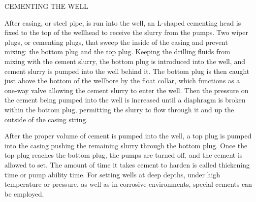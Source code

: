 CEMENTING THE WELL

\vspace{1em}

After casing, or steel pipe, is run into the well, an L-shaped cementing 
head is fixed to the top of the wellhead to receive the slurry from the pumps. 
Two wiper plugs, or cementing plugs, that sweep the
inside of the casing and prevent mixing: the bottom plug and the top plug.
Keeping the drilling fluids from mixing with the cement slurry, 
the bottom plug is introduced into the well, and cement slurry is pumped into the well behind it. 
The bottom plug is then caught just above the bottom of the wellbore by the float collar, 
which functions as a one-way valve allowing the cement slurry to enter the well.
Then the pressure on the cement being pumped into the well is increased until a diaphragm is broken within the bottom plug,
 permitting the slurry to flow through it and up the outside of the casing string.



After the proper volume of cement is pumped into the well, a top plug is pumped into 
the casing pushing the remaining slurry through the bottom plug.
 Once the top plug reaches the bottom plug, the pumps are turned off, and the cement is allowed to set.
The amount of time it takes cement to harden is called thickening time or pump ability time. 
For setting wells at deep depths, under high temperature or pressure, as well as in corrosive environments,
 special cements can be employed.


    